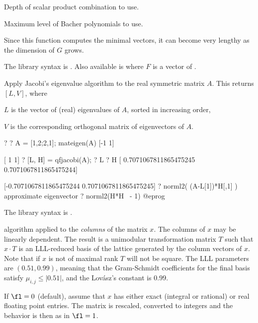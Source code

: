 \item {} Depth of scalar product combination to use.

\item {} Maximum level of Bacher polynomials to use.

Since this function computes the minimal vectors, it can become very lengthy
as the dimension of $G$ grows.

The library syntax is .
Also available is
where $F$ is a vector of .

\label{se:qfjacobi}
Apply Jacobi's eigenvalue algorithm to the real symmetric matrix $A$.
This returns $[L, V]$, where

\item $L$ is the vector of (real) eigenvalues of $A$, sorted in increasing
order,

\item $V$ is the corresponding orthogonal matrix of eigenvectors of $A$.

\bprog
? 
? A = [1,2;2,1]; mateigen(A)
[-1 1]

[ 1 1]
? [L, H] = qfjacobi(A);
? L
? H
[ 0.7071067811865475245 0.7071067811865475244]

[-0.7071067811865475244 0.7071067811865475245]
? norml2( (A-L[1])*H[,1] )       \\ approximate eigenvector
? norml2(H*H~ - 1)
@eprog

The library syntax is .

\label{se:qflll}
 algorithm applied to the
\emph{columns} of the matrix $x$. The columns of $x$ may be linearly
dependent. The result is a unimodular transformation matrix $T$ such that $x
\cdot T$ is an LLL-reduced basis of the lattice generated by the column
vectors of $x$. Note that if $x$ is not of maximal rank $T$ will not be
square. The LLL parameters are $(0.51,0.99)$, meaning that the Gram-Schmidt
coefficients for the final basis satisfy $\mu_{i,j} \leq |0.51|$, and the
Lov\'{a}sz's constant is $0.99$.

If $\fl=0$ (default), assume that $x$ has either exact (integral or
rational) or real floating point entries. The matrix is rescaled, converted
to integers and the behavior is then as in $\fl = 1$.

